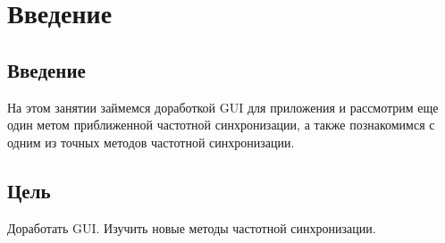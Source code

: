 \chapter{Введение}
\label{ch:intro}

\section{Введение} 

На этом занятии займемся доработкой GUI для приложения и рассмотрим еще один метом приближенной частотной синхронизации, а также 
познакомимся с одним из точных методов частотной синхронизации.

\section{Цель} 

Доработать GUI. Изучить новые методы частотной синхронизации.
\endinput